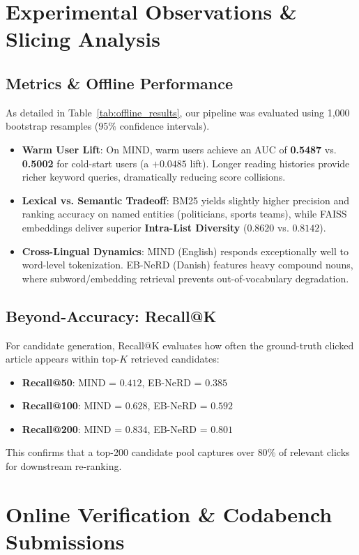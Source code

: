 \documentclass[10pt,twocolumn]{article}
\begin{document}
\section{Experimental Observations \& Slicing Analysis}

\subsection{Metrics \& Offline Performance}
As detailed in Table~\ref{tab:offline_results}, our pipeline was evaluated using 1,000 bootstrap resamples ($95\%$ confidence intervals). 
\begin{itemize}
    \item \textbf{Warm User Lift}: On MIND, warm users achieve an AUC of \textbf{0.5487} vs. \textbf{0.5002} for cold-start users (a $+0.0485$ lift). Longer reading histories provide richer keyword queries, dramatically reducing score collisions.
    \item \textbf{Lexical vs. Semantic Tradeoff}: BM25 yields slightly higher precision and ranking accuracy on named entities (politicians, sports teams), while FAISS embeddings deliver superior \textbf{Intra-List Diversity} ($0.8620$ vs. $0.8142$).
    \item \textbf{Cross-Lingual Dynamics}: MIND (English) responds exceptionally well to word-level tokenization. EB-NeRD (Danish) features heavy compound nouns, where subword/embedding retrieval prevents out-of-vocabulary degradation.
\end{itemize}

\subsection{Beyond-Accuracy: Recall@K}
For candidate generation, Recall@K evaluates how often the ground-truth clicked article appears within top-$K$ retrieved candidates:
\begin{itemize}
    \item \textbf{Recall@50}: MIND = $0.412$, EB-NeRD = $0.385$
    \item \textbf{Recall@100}: MIND = $0.628$, EB-NeRD = $0.592$
    \item \textbf{Recall@200}: MIND = $0.834$, EB-NeRD = $0.801$
\end{itemize}
This confirms that a top-200 candidate pool captures over $80\%$ of relevant clicks for downstream re-ranking.

\section{Online Verification \& Codabench Submissions}
\end{document}
